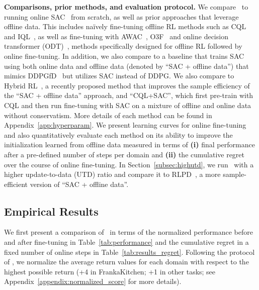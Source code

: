 \noindent \textbf{Comparisons, prior methods, and evaluation protocol.} We compare \methodname\ to running online SAC~\cite{haarnoja2018soft} from scratch, as well as prior approaches that leverage offline data. This includes na\"ively fine-tuning offline RL methods such as CQL~\cite{kumar2020conservative} and IQL~\cite{kostrikov2021offlineb}, as well as fine-tuning with AWAC~\citep{nair2020accelerating}, O3F~\cite{mark2022fine} and online decision transformer (ODT)~\citep{zheng2022online}, methods specifically designed for offline RL followed by online fine-tuning. In addition, we also compare to a baseline that trains SAC~\cite{haarnoja2018soft} using both online data and offline data (denoted by ``SAC + offline data'') that mimics DDPGfD~\citep{vecerik2017leveraging} but utilizes SAC instead of DDPG. We also compare to Hybrid RL~\citep{song2023hybrid}, a recently proposed method that improves the sample efficiency of the ``SAC + offline data'' approach, and ``CQL+SAC'', which first pre-train with CQL and then run fine-tuning with SAC on a mixture of offline and online data without conservatism. More details of each method can be found in Appendix~\ref{app:hyperparam}.
We present learning curves for online fine-tuning and also quantitatively evaluate each method on its ability to improve the initialization learned from offline data measured in terms of \textbf{(i)} final performance after a pre-defined number of steps per domain and \textbf{(ii)} the cumulative regret over the course of online fine-tuning. In Section~\ref{subsec:highutd}, we run \methodname\ with a higher update-to-data (UTD) ratio and compare it to RLPD~\cite{rlpd}, a more sample-efficient version of ``SAC + offline data''.

\vspace{-0.3cm}
\subsection{Empirical Results} 
\vspace{-0.2cm}

We first present a comparison of \methodname\ in terms of the normalized performance before and after fine-tuning in Table~\ref{tab:performance} and the cumulative regret in a fixed number of online steps in Table~\ref{tab:results_regret}. Following the protocol of \cite{fu2020d4rl}, we normalize the average return values for each domain with respect to the highest possible return (+4 in FrankaKitchen; +1 in other tasks; see Appendix~\ref{appendix:normalized_score} for more details).  

